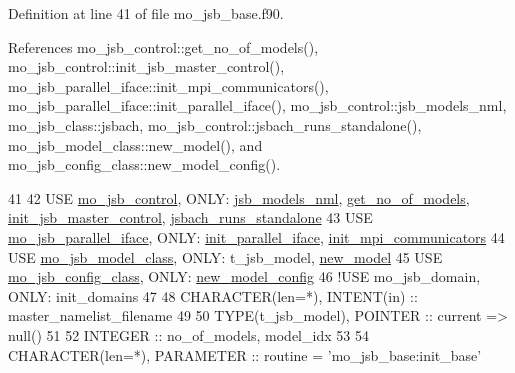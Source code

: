 Definition at line 41 of file mo\+\_\+jsb\+\_\+base.\+f90.



References mo\+\_\+jsb\+\_\+control\+::get\+\_\+no\+\_\+of\+\_\+models(), mo\+\_\+jsb\+\_\+control\+::init\+\_\+jsb\+\_\+master\+\_\+control(), mo\+\_\+jsb\+\_\+parallel\+\_\+iface\+::init\+\_\+mpi\+\_\+communicators(), mo\+\_\+jsb\+\_\+parallel\+\_\+iface\+::init\+\_\+parallel\+\_\+iface(), mo\+\_\+jsb\+\_\+control\+::jsb\+\_\+models\+\_\+nml, mo\+\_\+jsb\+\_\+class\+::jsbach, mo\+\_\+jsb\+\_\+control\+::jsbach\+\_\+runs\+\_\+standalone(), mo\+\_\+jsb\+\_\+model\+\_\+class\+::new\+\_\+model(), and mo\+\_\+jsb\+\_\+config\+\_\+class\+::new\+\_\+model\+\_\+config().


\begin{DoxyCode}
41 
42     \textcolor{keywordtype}{USE }\hyperlink{namespacemo__jsb__control}{mo\_jsb\_control}\textcolor{keywordtype}{,        ONLY}: \hyperlink{namespacemo__jsb__control_a71f0482fffea3f64acb60c7821436357}{jsb\_models\_nml}, 
      \hyperlink{namespacemo__jsb__control_ad3ab17f12f0cd28d5d8007f04a8f0cf2}{get\_no\_of\_models}, \hyperlink{namespacemo__jsb__control_a6090e428421fd94a977d2962605f4b85}{init\_jsb\_master\_control}, 
      \hyperlink{namespacemo__jsb__control_a6ca5c01f6a6fd0446629cad234309fe2}{jsbach\_runs\_standalone}
43     \textcolor{keywordtype}{USE }\hyperlink{namespacemo__jsb__parallel__iface}{mo\_jsb\_parallel\_iface}\textcolor{keywordtype}{, ONLY}: \hyperlink{namespacemo__jsb__parallel__iface_a2701efacd4758b8d69ba2edfa9cf157d}{init\_parallel\_iface}, 
      \hyperlink{namespacemo__jsb__parallel__iface_a32513d5e93412ac7366922368068e91e}{init\_mpi\_communicators}
44     \textcolor{keywordtype}{USE }\hyperlink{namespacemo__jsb__model__class}{mo\_jsb\_model\_class}\textcolor{keywordtype}{,    ONLY}: t\_jsb\_model, \hyperlink{namespacemo__jsb__model__class_adf5b91c2a2a066c645b083ed656d2a79}{new\_model}
45     \textcolor{keywordtype}{USE }\hyperlink{namespacemo__jsb__config__class}{mo\_jsb\_config\_class}\textcolor{keywordtype}{,   ONLY}: \hyperlink{namespacemo__jsb__config__class_a1954d6f33b1cea7b395655837a1377db}{new\_model\_config}
46     \textcolor{comment}{!USE mo\_jsb\_domain,         ONLY: init\_domains}
47 
48     \textcolor{keywordtype}{CHARACTER(len=*)}, \textcolor{keywordtype}{INTENT(in)} :: master\_namelist\_filename
49 
50     \textcolor{keywordtype}{TYPE}(t\_jsb\_model), \textcolor{keywordtype}{POINTER} :: current => null()
51 
52     \textcolor{keywordtype}{INTEGER} :: no\_of\_models, model\_idx
53 
54     \textcolor{keywordtype}{CHARACTER(len=*)}, \textcolor{keywordtype}{PARAMETER} :: routine = \textcolor{stringliteral}{'mo\_jsb\_base:init\_base'}

\end{DoxyCode}
